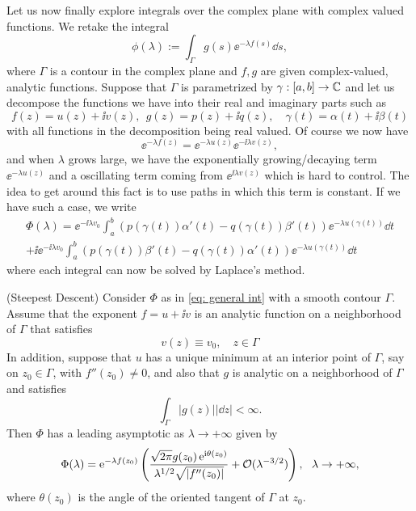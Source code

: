 Let us now finally explore integrals over the complex plane with complex valued functions. We retake the integral 
\begin{equation}
	\phi(\lambda) := \int_{\Gamma} g(s) \ee^{-\lambda f(s)} \dd s,
	\label{eq: general int}
\end{equation}
where $\Gamma$ is a contour in the complex plane and $f, g$ are given complex-valued, analytic functions. Suppose that $\Gamma$ is parametrized by $\gamma : [a,b] \rightarrow \mathbb{C}$ and let us decompose the functions we have into their real and imaginary parts such as
\begin{equation}
	f(z) = u(z) + \ii v(z), \ \ g(z) = p(z) + \ii q(z), \quad \gamma(t) = \alpha(t) + \ii \beta(t)
\end{equation}
with all functions in the decomposition being real valued. Of course we now have 
\begin{equation}
	\ee^{-\lambda f(z)} = \ee^{-\lambda u(z)} \ee^{-\ii \lambda v(z)},
\end{equation}
and when $\lambda$ grows large, we have the exponentially growing/decaying term $\ee^{-\lambda u(z)}$ and a oscillating term coming from $\ee^{\ii \lambda v(z)}$ which is hard to control. The idea to get around this fact is to use paths in which this term is constant. If we have such a case, we write
\begin{multline}
	\Phi(\lambda) = \ee^{-\ii \lambda v_0} \int_{a}^{b} (p(\gamma(t))\alpha'(t)-q(\gamma(t))\beta'(t)) \ee^{-\lambda u(\gamma(t))} \dd t \\
	+ \ii \ee^{-\ii \lambda v_0} \int_{a}^{b} (p(\gamma(t))\beta'(t)-q(\gamma(t))\alpha'(t)) \ee^{-\lambda u(\gamma(t))} \dd t
	\label{eq: decomposition}
\end{multline}
where each integral can now be solved by Laplace's method.

\begin{teorema} (Steepest Descent)
	Consider $\Phi$ as in \eqref{eq: general int} with a smooth contour $\Gamma$. Assume that the exponent $f = u + \ii v$ is an analytic function on a neighborhood of $\Gamma$ that satisfies
	\begin{equation}
		v(z) \equiv v_0, \quad z \in \Gamma
	\end{equation}
	In addition, suppose that $u$ has a unique minimum at an interior point of $\Gamma$, say on $z_0 \in \Gamma$, with $f''(z_0) \neq 0$, and also that $g$ is analytic on a neighborhood of $\Gamma$  and satisfies
	\begin{equation}
		\int_{\Gamma} |g(z)| |\dd z| < \infty.
	\end{equation}
	Then $\Phi$ has a leading asymptotic as $\lambda \rightarrow +\infty$ given by
	\begin{equation}
		\Phi(\lambda) = \operatorname{e}^{-\lambda f(z_0)} \left(\frac{\sqrt{2\pi}g(z_0)\operatorname{e}^{\mathrm{i} \theta(z_0)}}{\lambda^{1/2}\sqrt{|f''(z_0)|}} + \mathcal{O}(\lambda^{-3/2}) \right), \ \ \lambda \rightarrow + \infty,
	\end{equation}
	where $\theta(z_0)$ is the angle of the oriented tangent of $\Gamma$ at $z_0$.
\end{teorema}

